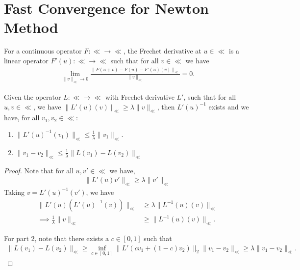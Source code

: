 \section{Fast Convergence for Newton Method}
\label{sec:fast_convergence}

\begin{definition}
    For a continuous operator $F: \ll \to \ll$, 
    the Frechet derivative at $u \in \ll$
    is a linear operator $F'(u): \ll \to \ll$ such that for all $v\in \ll$ we have
    \begin{align*}
        \lim_{\|v\|_{\ll} \to 0} \frac{\|F(u + v) - F(u) - F'(u)(v)\|_{\ll}}{\|v\|_{\ll}} = 0.
    \end{align*}
\end{definition}

\begin{lemma}
    \label{lemma:frechet_upperbound}
    Given the operator $L: \ll \to \ll$
    with Frechet derivative $L'$,
    such that for all $u, v \in \ll$, we have
    $\|L'(u)(v)\|_{\ll} \geq \lambda \|v\|_{\ll}$, then 
    $L'(u)^{-1}$ exists and we have,
    for all $v_1, v_2 \in \ll$:
    \begin{enumerate}
        \item $\|L'(u)^{-1}(v_1)\|_{\ll} \leq \frac{1}{\lambda}\|v_1\|_{\ll}$.
        \item $\|v_1 - v_2\|_{\ll} 
            \leq \frac{1}{\lambda}\|L(v_1) - L(v_2)\|_{\ll}$
    \end{enumerate}
\end{lemma}
\begin{proof}
    Note that for all $u, v' \in \ll$ we have,
    \begin{align*}
        \|L'(u)v'\|_{\ll} \geq \lambda \|v'\|_{\ll}
    \end{align*}
    Taking $v = L'(u)^{-1}(v')$, we have
    \begin{align*}
        \|L'(u)\left(L'(u)^{-1}(v)\right)\|_{\ll} &\geq \lambda \|L^{-1}(u)(v)\|_{\ll}\\
        \implies
        \frac{1}{\lambda}\|v\|_{\ll} &\geq  \|L^{-1}(u)(v)\|_{\ll}.
    \end{align*}

    For part $2$, note that 
    there exists a $c \in [0, 1]$ 
    such that
    \begin{align*}
        \|L(v_1) - L(v_2)\|_{\ll} \geq \inf_{c \in [0, 1]}\|L'(c v_1  + (1 - c)v_2)\|_{2}\|v_1 - v_2\|_{\ll}
        \geq \lambda \|v_1 - v_2\|_{\ll}.
    \end{align*}
\end{proof}

